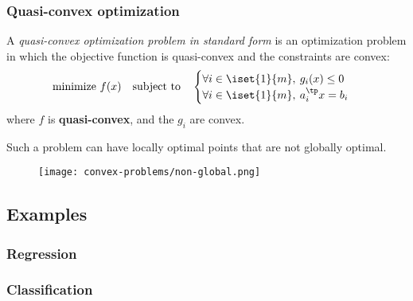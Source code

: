 \subsubsection{Quasi-convex optimization}
\begin{definition}
    A \emph{quasi-convex optimization problem in standard form} is an optimization problem in which the objective function is quasi-convex and the constraints are convex:
    \begin{equation*}
        \text{minimize } f(x) \quad\text{subject to}\quad \begin{cases}
            \forall i\in\iset{1}{m}, \: g_i(x)\leq 0\\
            \forall i\in\iset{1}{m}, \: a_i^\tp x = b_i
        \end{cases}
    \end{equation*}
    where $f$ is \textbf{quasi-convex}, and the $g_i$ are convex.
\end{definition}

\begin{remark}
    Such a problem can have locally optimal points that are not globally optimal.
    \begin{figure}[H]
        \centering
        \texttt{[image: convex-problems/non-global.png]}
    \end{figure}
\end{remark}

\subsection{Examples}
\subsubsection{Regression}
\subsubsection{Classification}